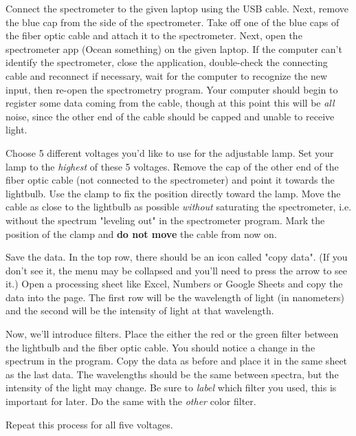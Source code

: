 \begin{steps}
\item Connect the spectrometer to the given laptop using the USB cable.  Next,
remove the blue cap from the side of the spectrometer. Take off one of the blue
caps of the fiber optic cable and attach it to the spectrometer.  Next, open
the spectrometer app (Ocean something) on the given laptop.  If the computer
can't identify the spectrometer, close the application, double-check the
connecting cable and reconnect if necessary, wait for the computer to recognize
the new input, then re-open the spectrometry program. Your computer should
begin to register some data coming from the cable, though at this point this
will be \emph{all} noise, since the other end of the cable should be capped and
unable to receive light.

\item Choose 5 different voltages you'd like to use for the adjustable lamp.
Set your lamp to the \emph{highest} of these 5 voltages.  Remove the cap of the
other end of the fiber optic cable (not connected to the spectrometer) and
point it towards the lightbulb. Use the clamp to fix the position directly
toward the lamp.  Move the cable as close to the lightbulb as possible
\emph{without} saturating the spectrometer, i.e. without the spectrum "leveling
out" in the spectrometer program. Mark the position of the clamp and \textbf{do
not move} the cable from now on.

\item Save the data. In the top row, there should be an icon called "copy data". (If
you don't see it, the menu may be collapsed and you'll need to press the arrow
to see it.) Open a processing sheet like Excel, Numbers or Google Sheets and
copy the data into the page. The first row will be the wavelength of light (in
nanometers) and the second will be the intensity of light at that wavelength.

\item Now, we'll introduce filters. Place the either the red or the green
filter between the lightbulb and the fiber optic cable. You should notice a
change in the spectrum in the program. Copy the data as before and place it in
the same sheet as the last data. The wavelengths should be the same between
spectra, but the intensity of the light may change. Be sure to \emph{label}
which filter you used, this is important for later. Do the same with the
\emph{other} color filter.

\item Repeat this process for all five voltages.


\end{steps}
